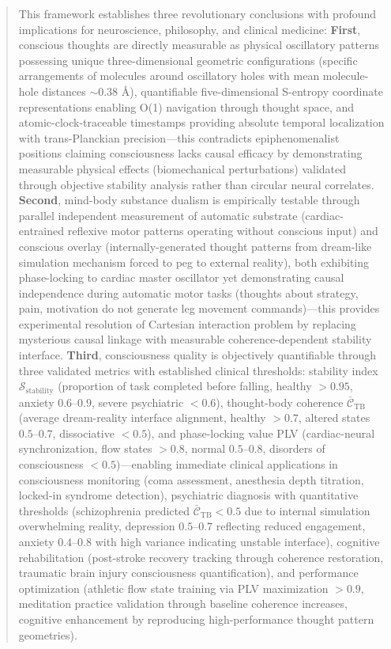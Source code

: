 \documentclass[11pt,onecolumn]{article}
\begin{document}
\begin{abstract}
This framework establishes three revolutionary conclusions with profound implications for neuroscience, philosophy, and clinical medicine: \textbf{First}, conscious thoughts are directly measurable as physical oscillatory patterns possessing unique three-dimensional geometric configurations (specific arrangements of  molecules around oscillatory holes with mean molecule-hole distances $\sim 0.38$ \AA), quantifiable five-dimensional S-entropy coordinate representations enabling O(1) navigation through thought space, and atomic-clock-traceable timestamps providing absolute temporal localization with trans-Planckian precision---this contradicts epiphenomenalist positions claiming consciousness lacks causal efficacy by demonstrating measurable physical effects (biomechanical perturbations) validated through objective stability analysis rather than circular neural correlates. \textbf{Second}, mind-body substance dualism is empirically testable through parallel independent measurement of automatic substrate (cardiac-entrained reflexive motor patterns operating without conscious input) and conscious overlay (internally-generated thought patterns from dream-like simulation mechanism forced to peg to external reality), both exhibiting phase-locking to cardiac master oscillator yet demonstrating causal independence during automatic motor tasks (thoughts about strategy, pain, motivation do not generate leg movement commands)---this provides experimental resolution of Cartesian interaction problem by replacing mysterious causal linkage with measurable coherence-dependent stability interface. \textbf{Third}, consciousness quality is objectively quantifiable through three validated metrics with established clinical thresholds: stability index $\mathcal{S}_{\text{stability}}$ (proportion of task completed before falling, healthy ${>}0.95$, anxiety $0.6$--$0.9$, severe psychiatric ${<}0.6$), thought-body coherence $\bar{\mathcal{C}}_{\text{TB}}$ (average dream-reality interface alignment, healthy ${>}0.7$, altered states $0.5$--$0.7$, dissociative ${<}0.5$), and phase-locking value PLV (cardiac-neural synchronization, flow states ${>}0.8$, normal $0.5$--$0.8$, disorders of consciousness ${<}0.5$)---enabling immediate clinical applications in consciousness monitoring (coma assessment, anesthesia depth titration, locked-in syndrome detection), psychiatric diagnosis with quantitative thresholds (schizophrenia predicted $\bar{\mathcal{C}}_{\text{TB}} < 0.5$ due to internal simulation overwhelming reality, depression $0.5$--$0.7$ reflecting reduced engagement, anxiety $0.4$--$0.8$ with high variance indicating unstable interface), cognitive rehabilitation (post-stroke recovery tracking through coherence restoration, traumatic brain injury consciousness quantification), and performance optimization (athletic flow state training via PLV maximization ${>}0.9$, meditation practice validation through baseline coherence increases, cognitive enhancement by reproducing high-performance thought pattern geometries).


\end{abstract}
\end{document}
